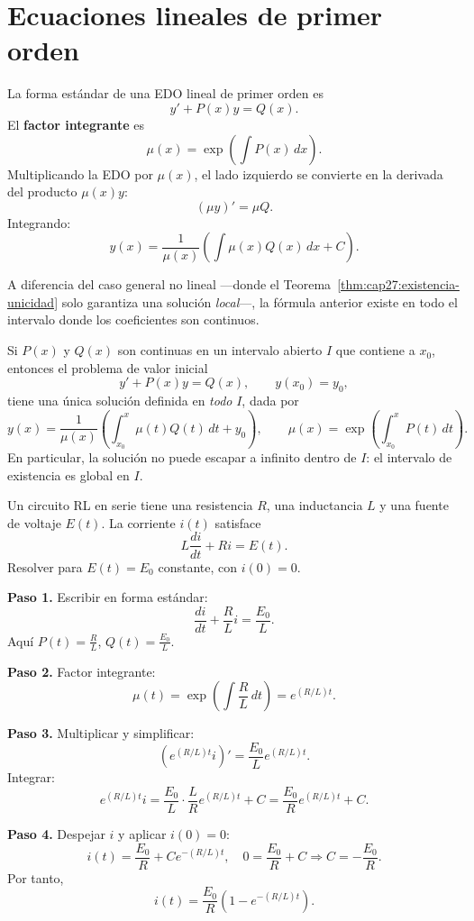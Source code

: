 \section{Ecuaciones lineales de primer orden}

La forma estándar de una EDO lineal de primer orden es
\[
y' + P(x)y = Q(x).
\]
El \textbf{factor integrante} es
\[
\mu(x) = \exp\left(\int P(x)\,dx\right).
\]
Multiplicando la EDO por \(\mu(x)\), el lado izquierdo se convierte en la derivada del producto \(\mu(x)y\):
\[
(\mu y)' = \mu Q.
\]
Integrando:
\[
y(x) = \frac{1}{\mu(x)}\left(\int \mu(x) Q(x)\,dx + C\right).
\]

A diferencia del caso general no lineal —donde el Teorema~\ref{thm:cap27:existencia-unicidad} solo garantiza una solución \emph{local}—, la fórmula anterior existe en todo el intervalo donde los coeficientes son continuos.

\begin{theorem}\label{thm:cap27:lineal-general}
Si \(P(x)\) y \(Q(x)\) son continuas en un intervalo abierto \(I\) que contiene a \(x_0\), entonces el problema de valor inicial
\[
y'+P(x)y=Q(x),\qquad y(x_0)=y_0,
\]
tiene una única solución definida en \emph{todo} \(I\), dada por
\[
y(x)=\frac{1}{\mu(x)}\left(\int_{x_0}^{x}\mu(t)Q(t)\,dt+y_0\right),\qquad \mu(x)=\exp\left(\int_{x_0}^{x}P(t)\,dt\right).
\]
En particular, la solución no puede escapar a infinito dentro de \(I\): el intervalo de existencia es global en \(I\).
\end{theorem}

\begin{example}
Un circuito RL en serie tiene una resistencia \(R\), una inductancia \(L\) y una fuente de voltaje \(E(t)\). La corriente \(i(t)\) satisface
\[
L\frac{di}{dt} + Ri = E(t).
\]
Resolver para \(E(t)=E_0\) constante, con \(i(0)=0\).

\begin{myproof}
\textbf{Paso 1.} Escribir en forma estándar:
\[
\frac{di}{dt} + \frac{R}{L}i = \frac{E_0}{L}.
\]
Aquí \(P(t)=\frac{R}{L}\), \(Q(t)=\frac{E_0}{L}\).

\textbf{Paso 2.} Factor integrante:
\[
\mu(t) = \exp\left(\int \frac{R}{L}\,dt\right) = e^{(R/L)t}.
\]

\textbf{Paso 3.} Multiplicar y simplificar:
\[
(e^{(R/L)t} i)' = \frac{E_0}{L} e^{(R/L)t}.
\]
Integrar:
\[
e^{(R/L)t} i = \frac{E_0}{L}\cdot \frac{L}{R} e^{(R/L)t} + C = \frac{E_0}{R} e^{(R/L)t} + C.
\]

\textbf{Paso 4.} Despejar \(i\) y aplicar \(i(0)=0\):
\[
i(t) = \frac{E_0}{R} + C e^{-(R/L)t}, \quad 0 = \frac{E_0}{R} + C \Rightarrow C = -\frac{E_0}{R}.
\]
Por tanto,
\[
\boxed{i(t) = \frac{E_0}{R}\left(1 - e^{-(R/L)t}\right)}.
\]
\end{myproof}
\end{example}

